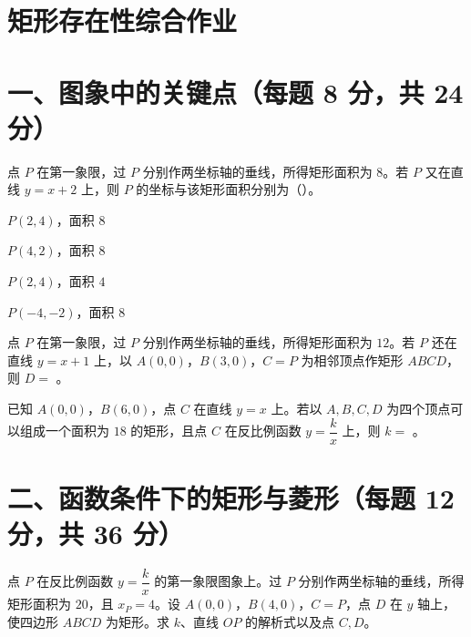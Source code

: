 \documentclass{exam-zh}
\newcommand{\answerarea}[1][40mm]{%
  \vspace{2mm}%
  \begin{tcolorbox}[
    enhanced, breakable,
    colback=white,
    colframe=white,
    boxrule=0pt,
    height=#1,
    valign=top,
    bottom=0mm,
    after skip=0mm,
  ]
  \end{tcolorbox}%
}
\begin{document}
\section*{矩形存在性综合作业}

\section*{一、图象中的关键点（每题 8 分，共 24 分）}


\begin{question}[points=8]
  点 $P$ 在第一象限，过 $P$ 分别作两坐标轴的垂线，所得矩形面积为 $8$。若 $P$ 又在直线 $y=x+2$ 上，则 $P$ 的坐标与该矩形面积分别为（\quad）。

  \begin{choices}
    \item $P(2,4)$，面积 $8$
    \item $P(4,2)$，面积 $8$
    \item $P(2,4)$，面积 $4$
    \item $P(-4,-2)$，面积 $8$
  \end{choices}
\end{question}



\begin{question}[points=8]
  点 $P$ 在第一象限，过 $P$ 分别作两坐标轴的垂线，所得矩形面积为 $12$。若 $P$ 还在直线 $y=x+1$ 上，以 $A(0,0)$，$B(3,0)$，$C=P$ 为相邻顶点作矩形 $ABCD$，则 $D=$ \underline{\hspace{2cm}}。

\end{question}



\begin{question}[points=8]
  已知 $A(0,0)$，$B(6,0)$，点 $C$ 在直线 $y=x$ 上。若以 $A,B,C,D$ 为四个顶点可以组成一个面积为 $18$ 的矩形，且点 $C$ 在反比例函数 $y=\dfrac{k}{x}$ 上，则 $k=$ \underline{\hspace{2cm}}。

\end{question}


\section*{二、函数条件下的矩形与菱形（每题 12 分，共 36 分）}


\begin{problem}[points=12]
  点 $P$ 在反比例函数 $y=\dfrac{k}{x}$ 的第一象限图象上。过 $P$ 分别作两坐标轴的垂线，所得矩形面积为 $20$，且 $x_P=4$。设 $A(0,0)$，$B(4,0)$，$C=P$，点 $D$ 在 $y$ 轴上，使四边形 $ABCD$ 为矩形。求 $k$、直线 $OP$ 的解析式以及点 $C,D$。

  \answerarea[55mm]
\end{problem}
\end{document}

